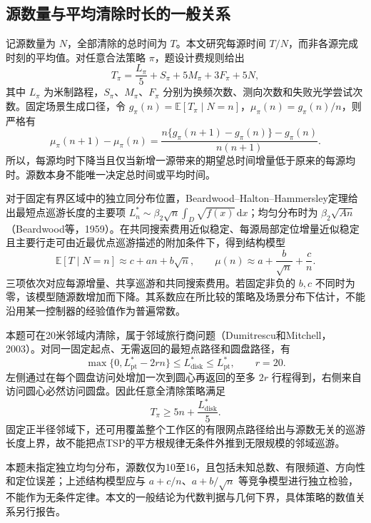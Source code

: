 \subsection{源数量与平均清除时长的一般关系}
记源数量为 $N$，全部清除的总时间为 $T$。本文研究每源时间 $T/N$，而非各源完成时刻的平均值。对任意合法策略 $\pi$，题设计费规则给出
\begin{equation}
 T_\pi=\frac{L_\pi}{5}+S_\pi+5M_\pi+3F_\pi+5N,
\end{equation}
其中 $L_\pi$ 为米制路程，$S_\pi$、$M_\pi$、$F_\pi$ 分别为换频次数、测向次数和失败光学尝试次数。固定场景生成口径，令 $g_\pi(n)=\mathbb E[T_\pi\mid N=n]$，$\mu_\pi(n)=g_\pi(n)/n$，则严格有
\begin{equation}
 \mu_\pi(n+1)-\mu_\pi(n)
 =\frac{n\{g_\pi(n+1)-g_\pi(n)\}-g_\pi(n)}{n(n+1)}.
\end{equation}
所以，每源均时下降当且仅当新增一源带来的期望总时间增量低于原来的每源均时。源数本身不能唯一决定总时间或平均时间。

对于固定有界区域中的独立同分布位置，Beardwood--Halton--Hammersley定理给出最短点巡游长度的主要项
$L_n^*\sim\beta_2\sqrt n\int_D\sqrt{f(x)}\,\mathrm dx$；均匀分布时为 $\beta_2\sqrt{An}$（Beardwood等，1959）。在共同搜索费用近似稳定、每源局部定位增量近似稳定且主要行走可由近最优点巡游描述的附加条件下，得到结构模型
\begin{equation}
 \mathbb E[T\mid N=n]\approx c+an+b\sqrt n,
 \qquad
 \mu(n)\approx a+\frac{b}{\sqrt n}+\frac cn.
\end{equation}
三项依次对应每源增量、共享巡游和共同搜索费用。若固定非负的 $b,c$ 不同时为零，该模型随源数增加而下降。其系数应在所比较的策略及场景分布下估计，不能沿用某一控制器的经验值作为普遍常数。

本题可在20米邻域内清除，属于邻域旅行商问题（Dumitrescu和Mitchell，2003）。对同一固定起点、无需返回的最短点路径和圆盘路径，有
\begin{equation}
 \max\{0,L^*_{\mathrm{pt}}-2rn\}
 \le L^*_{\mathrm{disk}}\le L^*_{\mathrm{pt}},\qquad r=20.
\end{equation}
左侧通过在每个圆盘访问处增加一次到圆心再返回的至多 $2r$ 行程得到，右侧来自访问圆心必然访问圆盘。因此任意全清除策略满足
\begin{equation}
 T_\pi\ge5n+\frac{L^*_{\mathrm{disk}}}{5}.
\end{equation}
固定正半径邻域下，还可用覆盖整个工作区的有限网点路径给出与源数无关的巡游长度上界，故不能把点TSP的平方根规律无条件外推到无限规模的邻域巡游。

本题未指定独立均匀分布，源数仅为10至16，且包括未知总数、有限频道、方向性和定位误差；上述结构模型应与 $a+c/n$、$a+b/\sqrt n$ 等竞争模型进行独立检验，不能作为无条件定律。本文的一般结论为代数判据与几何下界，具体策略的数值关系另行报告。

